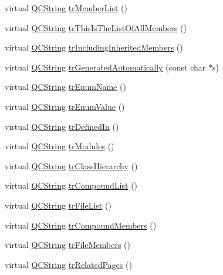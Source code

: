 \begin{DoxyCompactItemize}
virtual \hyperlink{class_q_c_string}{Q\-C\-String} \hyperlink{class_translator_russian_a5f788c561be2a2386720266688ad7561}{tr\-Member\-List} ()
\item 
virtual \hyperlink{class_q_c_string}{Q\-C\-String} \hyperlink{class_translator_russian_a011ff392bb2087e2804dc648db7b3bdd}{tr\-This\-Is\-The\-List\-Of\-All\-Members} ()
\item 
virtual \hyperlink{class_q_c_string}{Q\-C\-String} \hyperlink{class_translator_russian_ae6babe31ac1979ada5737392536bd239}{tr\-Including\-Inherited\-Members} ()
\item 
virtual \hyperlink{class_q_c_string}{Q\-C\-String} \hyperlink{class_translator_russian_a25156a73baa8406a915eaa5a6824b359}{tr\-Generated\-Automatically} (const char $\ast$s)
\item 
virtual \hyperlink{class_q_c_string}{Q\-C\-String} \hyperlink{class_translator_russian_a50df17e22ad96870c7937be7e1ab8dfc}{tr\-Enum\-Name} ()
\item 
virtual \hyperlink{class_q_c_string}{Q\-C\-String} \hyperlink{class_translator_russian_a5b1d2d5c6825641661ff2cfaeb84307e}{tr\-Enum\-Value} ()
\item 
virtual \hyperlink{class_q_c_string}{Q\-C\-String} \hyperlink{class_translator_russian_a5ee5473527c64fc3827deca81e253acf}{tr\-Defined\-In} ()
\item 
virtual \hyperlink{class_q_c_string}{Q\-C\-String} \hyperlink{class_translator_russian_aef7bca894dd93b7fd6803518cede7ef7}{tr\-Modules} ()
\item 
virtual \hyperlink{class_q_c_string}{Q\-C\-String} \hyperlink{class_translator_russian_a6676bf94846fa80e4a23cf9ea3214b54}{tr\-Class\-Hierarchy} ()
\item 
virtual \hyperlink{class_q_c_string}{Q\-C\-String} \hyperlink{class_translator_russian_adc612d045d0abf0cfa5085254fca8db5}{tr\-Compound\-List} ()
\item 
virtual \hyperlink{class_q_c_string}{Q\-C\-String} \hyperlink{class_translator_russian_a1c967abf4f2578ff4185ab2e10f71e14}{tr\-File\-List} ()
\item 
virtual \hyperlink{class_q_c_string}{Q\-C\-String} \hyperlink{class_translator_russian_a05e152ef7d0c15bb2b34fc12e1a25c56}{tr\-Compound\-Members} ()
\item 
virtual \hyperlink{class_q_c_string}{Q\-C\-String} \hyperlink{class_translator_russian_ae5ab09d67500e729b9f1b29f4ea57425}{tr\-File\-Members} ()
\item 
virtual \hyperlink{class_q_c_string}{Q\-C\-String} \hyperlink{class_translator_russian_a8ed40826492d6303375b3031fc88d3b2}{tr\-Related\-Pages} ()

\end{DoxyCompactItemize}
